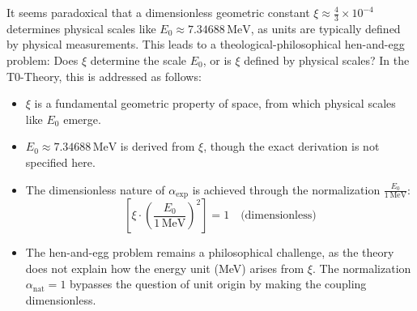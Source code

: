 \documentclass[12pt,a4paper]{article}
\theoremstyle{definition}
\begin{document}
It seems paradoxical that a dimensionless geometric constant \(\xi \approx \frac{4}{3} \times 10^{-4}\) determines physical scales like \(E_0 \approx 7.34688 \, \text{MeV}\), as units are typically defined by physical measurements. This leads to a theological-philosophical hen-and-egg problem: Does \(\xi\) determine the scale \(E_0\), or is \(\xi\) defined by physical scales? In the T0-Theory, this is addressed as follows:
\begin{itemize}
	\item \(\xi\) is a fundamental geometric property of space, from which physical scales like \(E_0\) emerge.
	\item \(E_0 \approx 7.34688 \, \text{MeV}\) is derived from \(\xi\), though the exact derivation is not specified here.
	\item The dimensionless nature of \(\alpha_{\text{exp}}\) is achieved through the normalization \(\frac{E_0}{1 \, \text{MeV}}\):
	\[
	\left[\xi \cdot \left(\frac{E_0}{1 \, \text{MeV}}\right)^2\right] = 1 \quad \text{(dimensionless)}
	\]
	\item The hen-and-egg problem remains a philosophical challenge, as the theory does not explain how the energy unit (MeV) arises from \(\xi\). The normalization \(\alpha_{\text{nat}} = 1\) bypasses the question of unit origin by making the coupling dimensionless.
\end{itemize}
	
\end{document}
